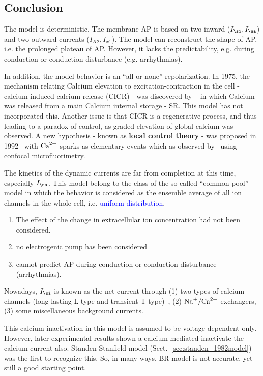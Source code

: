 \subsection{Conclusion}
\label{sec:conclusion} 

The model is deterministic. The membrane AP is based on two inward
($I_\si,I_\na$) and two outward currents ($I_{K2},I_{x1}$). The model can
reconstruct the shape of AP, i.e. the prolonged plateau of AP. However, it lacks
the predictability, e.g. during conduction or conduction disturbance (e.g.
arrhythmias).

In addition, the model behavior is an ``all-or-none'' repolarization. In 1975,
the mechanism relating Calcium elevation to excitation-contraction in the cell -
calcium-induced calcium-release (CICR) - was discovered by
~\citep{fabiato1975cic} in which Calcium was released from a main Calcium
internal storage - SR. This model has not incorporated this. Another issue is
that CICR is a regenerative process, and thus leading to a paradox of control,
as graded elevation of global calcium was observed. A new hypothesis - known as
{\bf local control theory} - was proposed in 1992~\citep{stern1992tec} with
${\text{Ca}^{2+}}$ sparks as elementary events which as observed by~\citep{cheng1993cse}
using confocal microfluorimetry.

The kinetics of the dynamic currents are far from completion at this
time, especially $I_\na$. This model belong to the class of the
so-called ``common pool'' model in which the behavior is considered as
the ensemble average of all ion channels in the whole cell, i.e.
\textcolor{blue}{uniform distribution}. 

\begin{enumerate}
\item The effect of the change in extracellular ion concentration had
  not been considered.
\item no electrogenic pump has been considered
\item cannot predict AP during conduction or conduction disturbance
  (arrhythmias). 
\end{enumerate}
Nowadays, $I_\si$ is known as the net current through (1) two types
of calcium channels (long-lasting L-type and transient
T-type)~\citep{bristow1982mmp}, (2) $\ce{Na+}/\Ca $ exchangers, (3)
some miscellaneous background currents.

This calcium inactivation in this model is assumed to be
voltage-dependent only. However, later experimental results shown a
calcium-mediated inactivate the calcium current
also. Standen-Stanfield model (Sect.~\ref{sec:standen_1982model}) was
the first to recognize this. So, in many ways, BR model is not
accurate, yet still a good starting point.

